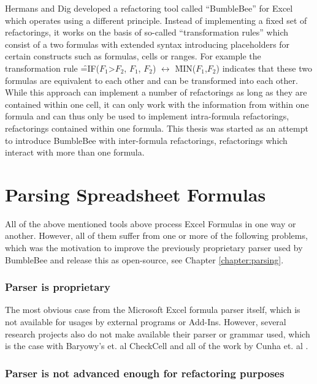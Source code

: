 Hermans and Dig \cite{hermans2014bumblebee} developed a refactoring tool called ``BumbleBee'' for Excel which operates using a different principle.
Instead of implementing a fixed set of refactorings, it works on the basis of so-called ``transformation rules'' which consist of a two formulas with extended syntax introducing placeholders for certain constructs such as formulas, cells or ranges.
For example the transformation rule \f{=IF($F_1$>$F_2$, $F_1$, $F_2$)} $\leftrightarrow$ \f{MIN($F_1$,$F_2$)} indicates that these two formulas are equivalent to each other and can be transformed into each other.
While this approach can implement a number of refactorings as long as they are contained within one cell, it can only work with the information from within one formula and can thus only be used to implement intra-formula refactorings, refactorings contained within one formula.
This thesis was started as an attempt to introduce BumbleBee with inter-formula refactorings, refactorings which interact with more than one formula.

\section{Parsing Spreadsheet Formulas}

All of the above mentioned tools above process Excel Formulas in one way or another.
However, all of them suffer from one or more of the following problems, which was the motivation to improve the previously proprietary parser used by BumbleBee and release this as open-source, see Chapter \ref{chapter:parsing}.

\subsubsection{Parser is proprietary}

The most obvious case from the Microsoft Excel formula parser itself, which is not available for usages by external programs or Add-Ins.
However, several research projects also do not make available their parser or grammar used, which is the case with Baryowy's et. al CheckCell \cite{barowy2014checkcell} and all of the work by Cunha et. al \cite{cunha2010automatically, cunha2012towards, cunha2012mdsheet}.

\subsubsection{Parser is not advanced enough for refactoring purposes}

